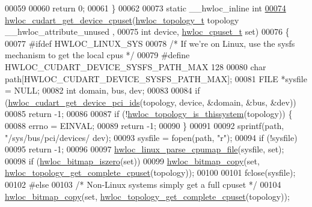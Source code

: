 \begin{DoxyCode}
00059 
00060   \textcolor{keywordflow}{return} 0;
00061 \}
00062 
00073 \textcolor{keyword}{static} \_\_hwloc\_inline \textcolor{keywordtype}{int}
\hypertarget{a00029_source_l00074}{}\hyperlink{a00071_ga2daaf1dd1a9a7f11ccbc6821374120e9}{00074} \hyperlink{a00071_ga2daaf1dd1a9a7f11ccbc6821374120e9}{hwloc_cudart_get_device_cpuset}(\hyperlink{a00039_ga9d1e76ee15a7dee158b786c30b6a6e38}{hwloc_topology_t} topology \_\_hwloc\_attribute\_unused
      ,
00075                                \textcolor{keywordtype}{int} device, \hyperlink{a00040_ga4bbf39b68b6f568fb92739e7c0ea7801}{hwloc_cpuset_t} \textcolor{keyword}{set})
00076 \{
00077 \textcolor{preprocessor}{#ifdef HWLOC\_LINUX\_SYS}
00078 \textcolor{preprocessor}{}  \textcolor{comment}{/* If we're on Linux, use the sysfs mechanism to get the local cpus */}
00079 \textcolor{preprocessor}{#define HWLOC\_CUDART\_DEVICE\_SYSFS\_PATH\_MAX 128}
00080 \textcolor{preprocessor}{}  \textcolor{keywordtype}{char} path[HWLOC\_CUDART\_DEVICE\_SYSFS\_PATH\_MAX];
00081   FILE *sysfile = NULL;
00082   \textcolor{keywordtype}{int} domain, bus, dev;
00083 
00084   \textcolor{keywordflow}{if} (\hyperlink{a00071_ga1cbf127459986c345f873e2752ddf681}{hwloc_cudart_get_device_pci_ids}(topology, device, &domain, &bus, &dev))
00085     \textcolor{keywordflow}{return} -1;
00086 
00087   \textcolor{keywordflow}{if} (!\hyperlink{a00046_ga0d109e33fc7990f62f665d336e5e5111}{hwloc_topology_is_thissystem}(topology)) \{
00088     errno = EINVAL;
00089     \textcolor{keywordflow}{return} -1;
00090   \}
00091 
00092   sprintf(path, \textcolor{stringliteral}{"/sys/bus/pci/devices/%
      dev);
00093   sysfile = fopen(path, \textcolor{stringliteral}{"r"});
00094   \textcolor{keywordflow}{if} (!sysfile)
00095     \textcolor{keywordflow}{return} -1;
00096 
00097   \hyperlink{a00067_gaeacad897c30dbea284948374ad4b010c}{hwloc_linux_parse_cpumap_file}(sysfile, \textcolor{keyword}{set});
00098   \textcolor{keywordflow}{if} (\hyperlink{a00065_gaa94fed35d2a598bc4a8657b6955b7bf5}{hwloc_bitmap_iszero}(\textcolor{keyword}{set}))
00099     \hyperlink{a00065_gab14743355fa03b36cef521cbcd2fbf64}{hwloc_bitmap_copy}(\textcolor{keyword}{set}, \hyperlink{a00060_ga418ebb39eaf1eac8f9cf4047cf59a534}{hwloc_topology_get_complete_cpuset}(topology));
00100 
00101   fclose(sysfile);
00102 \textcolor{preprocessor}{#else}
00103 \textcolor{preprocessor}{}  \textcolor{comment}{/* Non-Linux systems simply get a full cpuset */}
00104   \hyperlink{a00065_gab14743355fa03b36cef521cbcd2fbf64}{hwloc_bitmap_copy}(\textcolor{keyword}{set}, \hyperlink{a00060_ga418ebb39eaf1eac8f9cf4047cf59a534}{hwloc_topology_get_complete_cpuset}(topology));
}
\end{DoxyCode}

